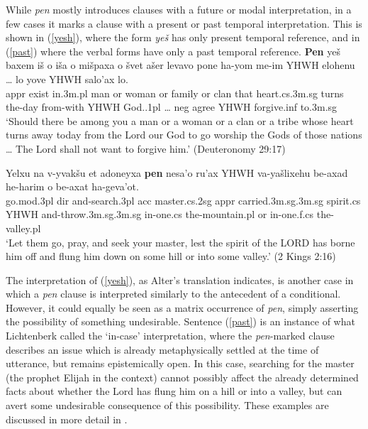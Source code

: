 \documentclass[output=paper,colorlinks,citecolor=brown]{langscibook}
\begin{document}
While \textit{pen} mostly introduces clauses with a future or modal interpretation, in a few cases it marks a clause with a present or past temporal interpretation. This is shown in (\ref{yesh}), where the form \textit{yeš} has only present temporal reference, and in (\ref{past}) where the verbal forms have only a past temporal reference.
\ea
\label{yesh} 
\gll \textbf{Pen} yeš baxem iš o iša o mišpaxa o švet ašer levavo pone ha-yom me-im YHWH elohenu  {\ldots} lo yove YHWH salo'ax lo. \\
{\sc appr} exist in.{\sc 3m.pl} man or woman or family or clan that heart.{\sc cs}.{\sc 3m.sg} turns the-day from-with YHWH God..{\sc 1pl} {\ldots} {\sc neg} agree YHWH forgive.{\sc inf} to.{\sc 3m.sg}  \\
\glt `Should there be among you a man or a woman or a clan or a tribe whose heart turns away today from the {\sc Lord} our God to go worship the Gods of those nations {\ldots} The {\sc Lord} shall not want to forgive him.' (Deuteronomy 29:17)
\z

\ea
\label{past} 
\gll Yelxu na v-yvakšu et adoneyxa  \textbf{pen} nesa'o ru'ax YHWH va-yašlixehu be-axad he-harim o be-axat ha-geva'ot. \\
go.{\sc mod.3pl} {\sc dir} and-search.{\sc 3pl} {\sc acc} master.{\sc cs}.{\sc 2sg} {\sc appr} carried.{\sc 3m.sg}.{\sc 3m.sg} spirit.{\sc cs} YHWH and-throw.{\sc 3m.sg.3m.sg} in-one.{\sc cs} the-mountain.{\sc pl} or in-one.{\sc f.cs} the-valley.{\sc pl} \\
\glt `Let them go, pray, and seek your master, lest the spirit of the LORD has borne him off and flung him down on some hill or into some valley.'  (2 Kings 2:16)
\z

 The interpretation of (\ref{yesh}), as Alter's translation indicates, is another case in which a \textit{pen} clause is interpreted similarly to the antecedent of a conditional. However, it could equally be seen as a matrix occurrence of \textit{pen}, simply asserting the possibility of something undesirable. Sentence (\ref{past}) is an instance of what Lichtenberk called the `in-case' interpretation, where the \textit{pen}-marked clause describes an issue which is already metaphysically settled at the time of utterance, but remains epistemically open. In this case, searching for the master (the prophet Elijah in the context) cannot possibly affect the already determined facts about whether the Lord has flung him on a hill or into a valley, but can avert some undesirable consequence of this possibility.  These examples are discussed in more detail in .
\end{document}
